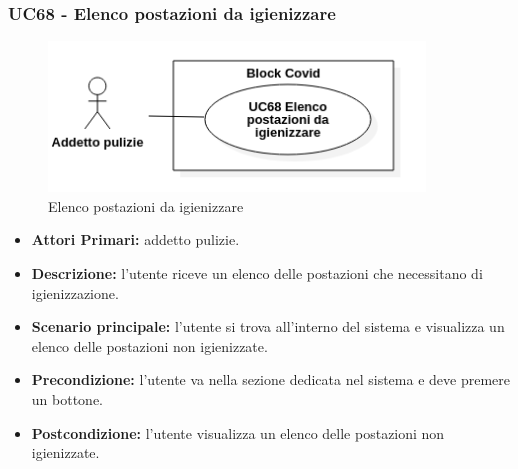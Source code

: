 \subsubsection{UC68 - Elenco postazioni da igienizzare}
\begin{figure}[H]
		\centering
		\includegraphics[width=10cm]{res/images/UC68.png}
		\caption{Elenco postazioni da igienizzare}
		\label{fig:Elenco postazioni da igienizzare}
	\end{figure}
\begin{itemize}
           	\item\textbf{Attori Primari:} addetto pulizie.
           	\item\textbf{Descrizione:} l'utente riceve un elenco delle postazioni che necessitano di igienizzazione.
           	\item\textbf{Scenario principale:} l'utente si trova all'interno del sistema e visualizza  un elenco delle postazioni non igienizzate.
           	\item\textbf{Precondizione:} l'utente va nella sezione dedicata nel sistema e deve premere un bottone.
           	\item\textbf{Postcondizione:} l'utente visualizza un elenco delle postazioni non igienizzate.
\end{itemize}

